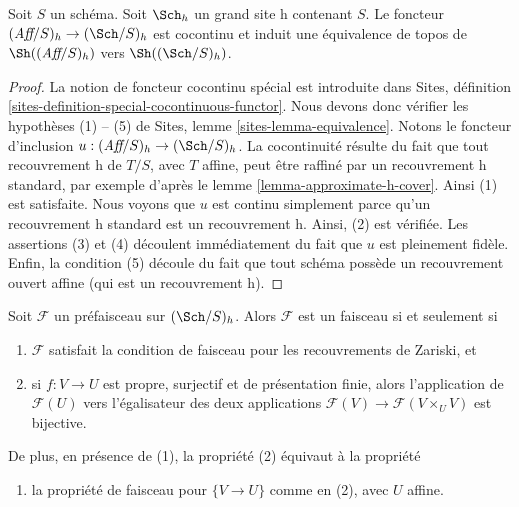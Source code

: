\begin{lemma}
\label{lemma-affine-big-site-h}
Soit $S$ un schéma. Soit $\Sch_h$ un grand
site h contenant $S$.
Le foncteur $(\textit{Aff}/S)_h \to (\Sch/S)_h$
est cocontinu et induit une équivalence de topos de
$\Sh((\textit{Aff}/S)_h)$ vers
$\Sh((\Sch/S)_h)$.
\end{lemma}

\begin{proof}
La notion de foncteur cocontinu spécial est introduite dans
Sites, définition \ref{sites-definition-special-cocontinuous-functor}.
Nous devons donc vérifier les hypothèses (1) -- (5) de
Sites, lemme \ref{sites-lemma-equivalence}.
Notons le foncteur d'inclusion
$u : (\textit{Aff}/S)_h \to (\Sch/S)_h$.
La cocontinuité résulte du fait que tout recouvrement h de
$T/S$, avec $T$ affine, peut être raffiné par un recouvrement h standard,
par exemple d'après le lemme \ref{lemma-approximate-h-cover}. Ainsi (1) est satisfaite.
Nous voyons que $u$ est continu simplement parce qu'un recouvrement h standard
est un recouvrement h.
Ainsi, (2) est vérifiée. Les assertions (3) et (4) découlent immédiatement du fait
que $u$ est pleinement fidèle. Enfin, la condition (5) découle du
fait que tout schéma possède un recouvrement ouvert affine (qui est
un recouvrement h).
\end{proof}

\begin{lemma}
\label{lemma-characterize-sheaf-h}
Soit $\mathcal{F}$ un préfaisceau sur $(\Sch/S)_h$.
Alors $\mathcal{F}$ est un faisceau si et seulement si
\begin{enumerate}
\item $\mathcal{F}$ satisfait la condition de faisceau pour les
recouvrements de Zariski, et
\item si $f : V \to U$ est propre, surjectif et de présentation finie, alors
l'application de $\mathcal{F}(U)$ vers l'égalisateur
des deux applications $\mathcal{F}(V) \to \mathcal{F}(V \times_U V)$ est bijective.
\end{enumerate}
De plus, en présence de (1), la propriété (2) équivaut à la
propriété
\begin{enumerate}
\item[(2')] la propriété de faisceau pour $\{V \to U\}$ comme en (2), avec $U$ affine.
\end{enumerate}
\end{lemma}

